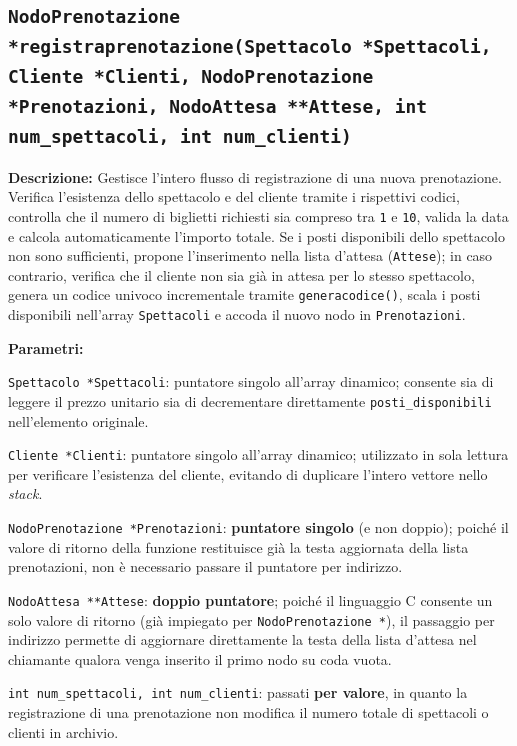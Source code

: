 \documentclass[11pt,a4paper,oneside,openany]{book}
\newenvironment{listacomp}{%
    \small
    \begin{list}{\textendash}{%
        \setlength{\topsep}{2pt}%
        \setlength{\partopsep}{0pt}%
        \setlength{\itemsep}{1pt}%
        \setlength{\parsep}{0pt}%
        \setlength{\leftmargin}{1.2em}%
    }%
}{%
    \end{list}%
}
\begin{document}
\subsection[registraprenotazione()]{\texttt{NodoPrenotazione *registraprenotazione(Spettacolo *Spettacoli, Cliente *Clienti, NodoPrenotazione *Prenotazioni, NodoAttesa **Attese, int num\_spettacoli, int num\_clienti)}}\label{sec:registraprenotazione}

\noindent\textbf{Descrizione:}
Gestisce l'intero flusso di registrazione di una nuova prenotazione. Verifica l'esistenza dello spettacolo e del cliente tramite i rispettivi codici, controlla che il numero di biglietti richiesti sia compreso tra \texttt{1} e \texttt{10}, valida la data e calcola automaticamente l'importo totale. Se i posti disponibili dello spettacolo non sono sufficienti, propone l'inserimento nella lista d'attesa (\texttt{Attese}); in caso contrario, verifica che il cliente non sia già in attesa per lo stesso spettacolo, genera un codice univoco incrementale tramite \texttt{generacodice()}, scala i posti disponibili nell'array \texttt{Spettacoli} e accoda il nuovo nodo in \texttt{Prenotazioni}.

\noindent\textbf{Parametri:}
\begin{listacomp}
    \item \texttt{Spettacolo *Spettacoli}: puntatore singolo all'array dinamico; consente sia di leggere il prezzo unitario sia di decrementare direttamente \texttt{posti\_disponibili} nell'elemento originale.
    \item \texttt{Cliente *Clienti}: puntatore singolo all'array dinamico; utilizzato in sola lettura per verificare l'esistenza del cliente, evitando di duplicare l'intero vettore nello \emph{stack}.
    \item \texttt{NodoPrenotazione *Prenotazioni}: \textbf{puntatore singolo} (e non doppio); poiché il valore di ritorno della funzione restituisce già la testa aggiornata della lista prenotazioni, non è necessario passare il puntatore per indirizzo.
    \item \texttt{NodoAttesa **Attese}: \textbf{doppio puntatore}; poiché il linguaggio C consente un solo valore di ritorno (già impiegato per \texttt{NodoPrenotazione *}), il passaggio per indirizzo permette di aggiornare direttamente la testa della lista d'attesa nel chiamante qualora venga inserito il primo nodo su coda vuota.
    \item \texttt{int num\_spettacoli, int num\_clienti}: passati \textbf{per valore}, in quanto la registrazione di una prenotazione non modifica il numero totale di spettacoli o clienti in archivio.
\end{listacomp}
\end{document}
